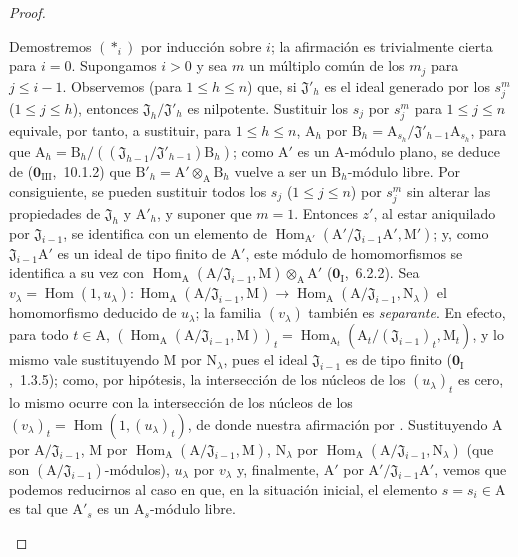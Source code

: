 \begin{proof}
\begin{enumerate}[label=(\roman*)]
  Demostremos $(*_i)$ por inducción sobre $i$; la afirmación es trivialmente cierta para $i=0$.
  Supongamos $i>0$ y sea $m$ un múltiplo común de los $m_j$ para $j\leq i-1$.
  Observemos (para $1\leq h\leq n$) que, si $\mathfrak{J}'_h$ es el ideal generado por los $s_j^m$ ($1\leq j\leq h$), entonces $\mathfrak{J}_h/\mathfrak{J}'_h$ es nilpotente.
  Sustituir los $s_j$ por $s_j^m$ para $1\leq j\leq n$ equivale, por tanto, a sustituir, para $1\leq h\leq n$, $\mathrm{A}_h$ por
  $\mathrm{B}_h=\mathrm{A}_{s_h}/\mathfrak{J}'_{h-1}\mathrm{A}_{s_h}$, para que
  $\mathrm{A}_h=\mathrm{B}_h/((\mathfrak{J}_{h-1}/\mathfrak{J}'_{h-1})\mathrm{B}_h)$; como $\mathrm{A}'$ es un $\mathrm{A}$-módulo plano, se deduce de ($\mathbf{0}_{\mathrm{III}}$,~10.1.2) que $\mathrm{B}'_h=\mathrm{A}'\otimes_\mathrm{A}\mathrm{B}_h$ vuelve a ser un $\mathrm{B}_h$-módulo libre.
  Por consiguiente, se pueden
  sustituir todos los $s_j$ ($1\leq j\leq n$) por $s_j^m$ sin alterar las propiedades de $\mathfrak{J}_h$ y $\mathrm{A}'_h$, y suponer que $m=1$.
  Entonces $z'$, al estar aniquilado por $\mathfrak{J}_{i-1}$, se identifica con un elemento de $\operatorname{Hom}_{\mathrm{A}'}(\mathrm{A}'/\mathfrak{J}_{i-1}\mathrm{A}',\mathrm{M}')$; y, como $\mathfrak{J}_{i-1}\mathrm{A}'$ es un ideal de tipo finito de $\mathrm{A}'$, este módulo de homomorfismos se identifica a su vez con $\operatorname{Hom}_\mathrm{A}(\mathrm{A}/\mathfrak{J}_{i-1},\mathrm{M})\otimes_\mathrm{A}\mathrm{A}'$ ($\mathbf{0}_{\mathrm{I}}$,~6.2.2).
  Sea $v_\lambda=\operatorname{Hom}(1,u_\lambda):\operatorname{Hom}_\mathrm{A}(\mathrm{A}/\mathfrak{J}_{i-1},\mathrm{M})\to\operatorname{Hom}_\mathrm{A}(\mathrm{A}/\mathfrak{J}_{i-1},\mathrm{N}_\lambda)$ el homomorfismo deducido de $u_\lambda$; la familia $(v_\lambda)$ también es \emph{separante}.
  En efecto, para todo $t\in\mathrm{A}$,
  $(\operatorname{Hom}_\mathrm{A}(\mathrm{A}/\mathfrak{J}_{i-1},\mathrm{M}))_t
  =\operatorname{Hom}_{\mathrm{A}_t}(\mathrm{A}_t/(\mathfrak{J}_{i-1})_t,\mathrm{M}_t)$,
  y lo mismo vale sustituyendo $\mathrm{M}$ por $\mathrm{N}_\lambda$, pues el ideal $\mathfrak{J}_{i-1}$ es de tipo finito ($\mathbf{0}_{\mathrm{I}}$,~1.3.5); como, por hipótesis, la intersección de los núcleos de los $(u_\lambda)_t$ es cero, lo mismo ocurre con la intersección de los núcleos de los $(v_\lambda)_t=\operatorname{Hom}(1,(u_\lambda)_t)$, de donde nuestra afirmación por .
  Sustituyendo $\mathrm{A}$ por $\mathrm{A}/\mathfrak{J}_{i-1}$, $\mathrm{M}$ por $\operatorname{Hom}_\mathrm{A}(\mathrm{A}/\mathfrak{J}_{i-1},\mathrm{M})$, $\mathrm{N}_\lambda$ por $\operatorname{Hom}_\mathrm{A}(\mathrm{A}/\mathfrak{J}_{i-1},\mathrm{N}_\lambda)$ (que son $(\mathrm{A}/\mathfrak{J}_{i-1})$-módulos), $u_\lambda$ por $v_\lambda$ y, finalmente, $\mathrm{A}'$ por $\mathrm{A}'/\mathfrak{J}_{i-1}\mathrm{A}'$, vemos que podemos reducirnos al caso en que, en la situación inicial, el elemento $s=s_i\in\mathrm{A}$ es tal que $\mathrm{A}'_s$ es un $\mathrm{A}_s$-módulo libre.

\end{enumerate}
\end{proof}
